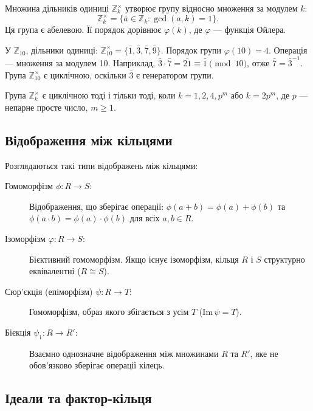 Множина дільників одиниці \(\mathbb{Z}_k^\times\) утворює групу відносно множення за модулем \(k\):
\[
    \mathbb{Z}_k^\times = \{\bar{a}\in\mathbb{Z}_k : \gcd(a,k)=1\}.
\]
Ця група є абелевою.
Її порядок дорівнює \(\varphi(k)\), де \(\varphi\) — функція Ойлера.

\begin{example}
    \label{ex:z10_units}
    У \(\mathbb{Z}_{10}\), дільники одиниці: \(\mathbb{Z}_{10}^\times = \{\bar{1},\bar{3},\bar{7},\bar{9}\}\).
    Порядок групи \(\varphi(10) = 4\).
    Операція — множення за модулем 10.
    Наприклад, \(\bar{3}\cdot\bar{7} = \overline{21} \equiv \bar{1} \pmod{10}\), отже \(\bar{7} = \bar{3}^{-1}\).
    Група \(\mathbb{Z}_{10}^\times\) є циклічною, оскільки \(\bar{3}\) є генератором групи.
\end{example}

\begin{theorem}
    \label{thm:cyclic_units}
    Група \(\mathbb{Z}_k^\times\) є циклічною тоді і тільки тоді, коли \(k=1,2,4,p^m\) або \(k=2p^m\), де \(p\) — непарне просте число, \(m\geq1\).
\end{theorem}

\subsection{Відображення між кільцями}
\label{subsec:ring_mappings}

Розглядаються такі типи відображень між кільцями:

\begin{description}
    \item[Гомоморфізм \(\phi: R\to S\):] Відображення, що зберігає операції: \(\phi(a+b)=\phi(a)+\phi(b)\) та \(\phi(a\cdot b)=\phi(a)\cdot\phi(b)\) для всіх \(a,b\in R\).
    \item[Ізоморфізм \(\varphi: R\to S\):] Бієктивний гомоморфізм.
    Якщо існує ізоморфізм, кільця \(R\) і \(S\) структурно еквівалентні (\(R\cong S\)).
    \item[Сюр’єкція (епіморфізм) \(\psi: R\to T\):] Гомоморфізм, образ якого збігається з усім \(T\) (\(\mathrm{Im}\,\psi = T\)).
    \item[Бієкція \(\psi_1: R\to R'\):] Взаємно однозначне відображення між множинами \(R\) та \(R'\), яке не обов’язково зберігає операції кілець.
\end{description}

\subsection{Ідеали та фактор-кільця}
\label{subsec:factor_rings}

